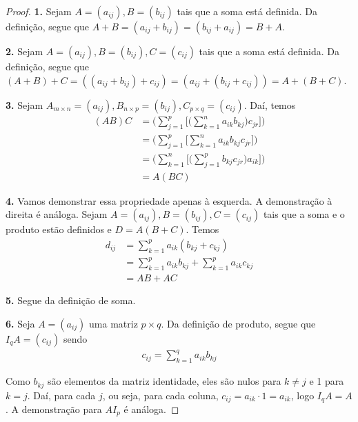\documentclass{article}
\begin{document}
\begin{proof}
	\textbf{1.} Sejam $A = (a_{ij}), B = (b_{ij})$ tais que a soma está definida. Da definição, segue que $A+B = (a_{ij} + b_{ij}) = (b_{ij} + a_{ij}) = B+A$.
	\par\vspace{0.4cm}
	\hspace{17pt}\textbf{2.} Sejam $A = (a_{ij}), B = (b_{ij}), C = (c_{ij})$ tais que a soma está definida. Da definição, segue que $(A +B)+C = ((a_{ij}+b_{ij})+c_{ij}) = (a_{ij} + (b_{ij}+c_{ij})) = A+(B+C)$.
	\par\vspace{0.4cm}
	\hspace{17pt}\textbf{3.} Sejam $\displaystyle{A_{m\times n} = (a_{ij}), B_{n\times p} = (b_{ij}), C_{p\times q} = (c_{ij})}$. Daí, temos 
	\begin{align*}
	(AB)C &= \Bigg(\sum_{j=1}^{p}\Bigg[\bigg(\sum_{k=1}^{n}a_{ik}b_{kj} \bigg)c_{jr} \Bigg]\Bigg) \\
	&= \Bigg(\sum_{j=1}^{p}\Bigg[ \sum_{k=1}^{n}a_{ik}b_{kj}c_{jr}\Bigg]\Bigg) \\
	&= \Bigg(\sum_{k=1}^{n}\Bigg[\bigg(\sum_{j=1}^{p}b_{kj}c_{jr} \bigg)a_{ik} \Bigg]\Bigg) \\
	&= A(BC)
	\end{align*}
	

	\par\vspace{0.4cm}
	\hspace{17pt}\textbf{4.} Vamos demonstrar essa propriedade apenas à esquerda. A demonstração à direita é análoga. Sejam $A = (a_{ij}), B = (b_{ij}), C = (c_{ij})$ tais que a soma e o produto estão definidos e $D = A(B+C)$. Temos
	\begin{align*}
	d_{ij} &= \sum_{k=1}^{p}a_{ik}(b_{kj} + c_{kj}) \\
	&= \sum_{k=1}^{p}a_{ik}b_{kj} + \sum_{k=1}^{p}a_{ik}c_{kj} \\
	&= AB+AC
	\end{align*} 
	\par\vspace{0.4cm}
	\hspace{17pt}\textbf{5.} Segue da definição de soma.
	\par\vspace{0.4cm}
	\hspace{17pt}\textbf{6.} Seja $A = (a_{ij})$ uma matriz $p\times q$. Da definição de produto, segue que $I_qA = (c_{ij})$ sendo
	\begin{align*}
	c_{ij} = \sum_{k=1}^{q}a_{ik}b_{kj} 
	\end{align*} 
	\par\vspace{0.3cm} Como $b_{kj}$ são elementos da matriz identidade, eles são nulos para $k\neq j$ e 1 para $k=j$. Daí, para cada $j$, ou seja, para cada coluna, $c_{ij} = a_{ik}\cdot1 = a_{ik}$, logo $I_qA = A$. A demonstração para $AI_p$ é análoga.
\end{proof}
\end{document}
